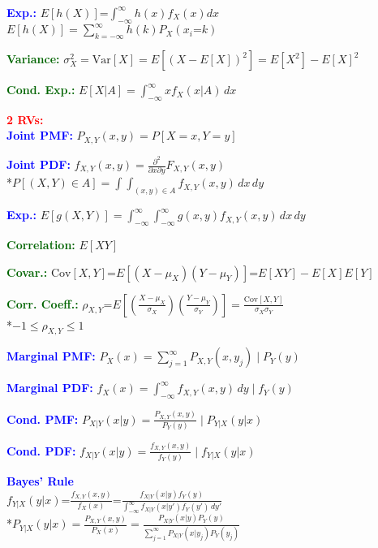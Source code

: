 \documentclass[5pt]{extarticle} %
\begin{document}
\begin{paracol}{3}
{    \textcolor{blue}{\textbf{Exp.:}} $E[h(X)] \text{=} \int_{-\infty}^{\infty} h(x) f_X(x) dx$ \\
    $E[h(X)]= \sum_{k=-\infty}^{\infty} h(k) P_X(x_i \text{=} k)$ 

    \textcolor{darkgreen}{\textbf{Variance:}} $\sigma_X^2 = \text{Var}[X] = E[(X - E[X])^2] = E[X^2] - E[X]^2$

    \textcolor{darkgreen}{\textbf{Cond. Exp.:}} $E[X|A] = \int_{-\infty}^{\infty} x f_X(x|A) \, dx$ 

    \textcolor{red}{\textbf{2 RVs:}}  \\
    \textcolor{blue}{\textbf{Joint PMF:}} $P_{X,Y}(x, y) = P[X = x, Y = y]$

    \textcolor{blue}{\textbf{Joint PDF:}} $f_{X,Y}(x, y) = \frac{\partial^2}{\partial x \partial y} F_{X,Y}(x, y)$ \\
    *$P[(X, Y) \in A] = \int \int_{(x, y) \in A} f_{X,Y}(x, y) \, dx \, dy$

    \textcolor{blue}{\textbf{Exp.:}} $E[g(X, Y)] = \int_{-\infty}^{\infty} \int_{-\infty}^{\infty} g(x, y) f_{X,Y}(x, y) \, dx \, dy$

    \textcolor{darkgreen}{\textbf{Correlation:}} $E[XY]$

    \textcolor{darkgreen}{\textbf{Covar.:}} $\text{Cov}[X, Y] \text{=} E[(X - \mu_X)(Y - \mu_Y)] \text{=} E[XY] - E[X] E[Y]$

    \textcolor{darkgreen}{\textbf{Corr. Coeff.:}} $\rho_{X,Y} \text{=} E\left[ \left( \frac{X - \mu_X}{\sigma_X} \right) \left( \frac{Y - \mu_Y}{\sigma_Y} \right) \right] = \frac{\text{Cov}[X, Y]}{\sigma_X \sigma_Y}$ \\
    *$-1 \leq \rho_{X,Y} \leq 1$

    \textcolor{blue}{\textbf{Marginal PMF:}} $P_X(x) = \sum_{j=1}^\infty P_{X,Y}(x, y_j) \mid P_Y(y)$

    \textcolor{blue}{\textbf{Marginal PDF:}} $f_X(x) = \int_{-\infty}^{\infty} f_{X,Y}(x, y) \, dy \mid f_Y(y)$

    \textcolor{blue}{\textbf{Cond. PMF:}} $P_{X|Y}(x|y) = \frac{P_{X,Y}(x, y)}{P_Y(y)} \mid P_{Y|X}(y|x)$

    \textcolor{blue}{\textbf{Cond. PDF:}} $f_{X|Y}(x|y) = \frac{f_{X,Y}(x, y)}{f_Y(y)} \mid f_{Y|X}(y|x)$

    \textcolor{blue}{\textbf{Bayes' Rule}} \\ 
    $f_{Y|X}(y|x) \text{=} \frac{f_{X,Y} (x,y)}{f_X (x)} \text{=} \frac{f_{X|Y} (x|y) f_Y (y)}{\int_{-\infty}^{\infty} f_{X|Y} (x|y') f_Y (y') \, dy'}$ \\
    *$P_{Y|X}(y|x) = \frac{P_{X,Y}(x, y)}{P_X(x)} = \frac{P_{X|Y}(x|y) P_Y(y)}{\sum_{j=1}^\infty P_{X|Y}(x|y_j) P_Y(y_j)}$

}
\end{paracol}
\end{document}
